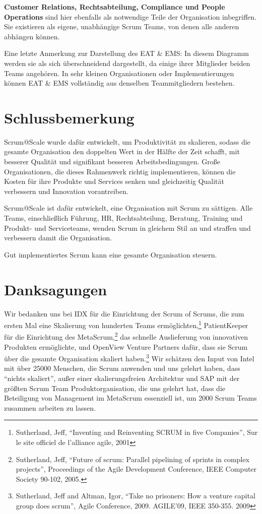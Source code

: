 \documentclass[12pt,a4paper,parskip=full]{scrartcl}
\begin{document}
\textbf{Customer Relations, Rechtsabteilung, Compliance und People Operations}
sind hier ebenfalls als notwendige Teile der Organisation inbegriffen. Sie
existieren als eigene, unabhängige Scrum Teams, von denen alle anderen abhängen
können.

Eine letzte Anmerkung zur Darstellung des EAT \& EMS: In diesem Diagramm werden
sie als sich überschneidend dargestellt, da einige ihrer Mitglieder beiden
Teams angehören. In sehr kleinen Organisationen oder Implementierungen können
EAT \& EMS vollständig aus denselben Teammitgliedern bestehen.

\section{Schlussbemerkung}
Scrum@Scale wurde dafür entwickelt, um Produktivität zu skalieren, sodass die
gesamte Organisation den doppelten Wert in der Hälfte der Zeit schafft, mit
besserer Qualität und signifikant besseren Arbeitsbedingungen. Große
Organisationen, die dieses Rahmenwerk richtig implementieren, können die Kosten
für ihre Produkte und Services senken und gleichzeitig Qualität verbessern und
Innovation vorantreiben.

Scrum@Scale ist dafür entwickelt, eine Organisation mit Scrum zu sättigen. Alle Teams, 
einschließlich Führung, HR, Rechtsabteilung, Beratung, Training und Produkt-
und Serviceteams, wenden Scrum in gleichem Stil an und straffen und verbessern damit die Organisation.

Gut implementiertes Scrum kann eine gesamte Organisation steuern.

\section{Danksagungen}
Wir bedanken uns bei IDX für die Einrichtung der Scrum of Scrums, die zum ersten
Mal eine Skalierung von hunderten Teams ermöglichten,\footnote{Sutherland, Jeff,
``Inventing and Reinventing SCRUM in five Companies'', Sur le site officiel
de l'alliance agile, 2001} PatientKeeper für die Einrichtung des
MetaScrum,\footnote{Sutherland, Jeff, ``Future of scrum: Parallel pipelining of
sprints in complex projects'', Proceedings of the Agile Development Conference,
IEEE Computer Society 90-102,  2005.} das schnelle Auslieferung von innovativen
Produkten ermöglichte, und OpenView Venture Partners dafür, dass sie Scrum über
die gesamte Organisation skaliert haben.\footnote{Sutherland, Jeff and Altman,
Igor, ``Take no prisoners: How a venture capital group does scrum'', Agile
Conference, 2009. AGILE'09, IEEE 350-355.  2009} Wir schätzen den Input von Intel
mit über 25000 Menschen, die Scrum anwenden und uns gelehrt haben, dass
``nichts skaliert'', außer einer skalierungsfreien Architektur und SAP mit der
größten Scrum Team Produktorganisation, die uns gelehrt hat, dass die
Beteiligung von Management im MetaScrum essenziell ist, um 2000 Scrum Teams
zusammen arbeiten zu lassen.
\end{document}
